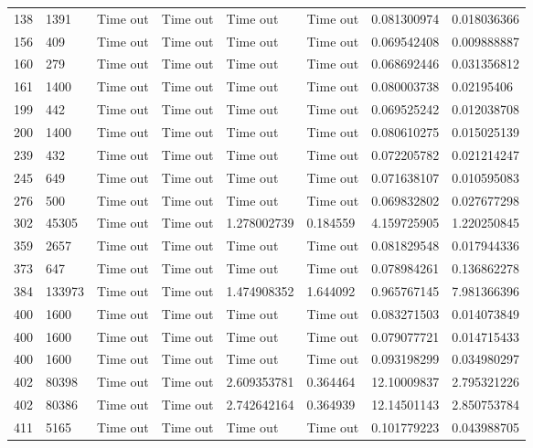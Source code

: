 \begin{longtable}{@{}llllllll@{}}
138       & 1391    & Time out & Time out & Time out       & Time out & 0.081300974 & 0.018036366 \\
156       & 409     & Time out & Time out & Time out       & Time out & 0.069542408 & 0.009888887 \\
160       & 279     & Time out & Time out & Time out       & Time out & 0.068692446 & 0.031356812 \\
161       & 1400    & Time out & Time out & Time out       & Time out & 0.080003738 & 0.02195406  \\
199       & 442     & Time out & Time out & Time out       & Time out & 0.069525242 & 0.012038708 \\
200       & 1400    & Time out & Time out & Time out       & Time out & 0.080610275 & 0.015025139 \\
239       & 432     & Time out & Time out & Time out       & Time out & 0.072205782 & 0.021214247 \\
245       & 649     & Time out & Time out & Time out       & Time out & 0.071638107 & 0.010595083 \\
276       & 500     & Time out & Time out & Time out       & Time out & 0.069832802 & 0.027677298 \\
302       & 45305   & Time out & Time out & 1.278002739    & 0.184559 & 4.159725905 & 1.220250845 \\
359       & 2657    & Time out & Time out & Time out       & Time out & 0.081829548 & 0.017944336 \\
373       & 647     & Time out & Time out & Time out       & Time out & 0.078984261 & 0.136862278 \\
384       & 133973  & Time out & Time out & 1.474908352    & 1.644092 & 0.965767145 & 7.981366396 \\
400       & 1600    & Time out & Time out & Time out       & Time out & 0.083271503 & 0.014073849 \\
400       & 1600    & Time out & Time out & Time out       & Time out & 0.079077721 & 0.014715433 \\
400       & 1600    & Time out & Time out & Time out       & Time out & 0.093198299 & 0.034980297 \\
402       & 80398   & Time out & Time out & 2.609353781    & 0.364464 & 12.10009837 & 2.795321226 \\
402       & 80386   & Time out & Time out & 2.742642164    & 0.364939 & 12.14501143 & 2.850753784 \\
411       & 5165    & Time out & Time out & Time out       & Time out & 0.101779223 & 0.043988705 \\

\end{longtable}
